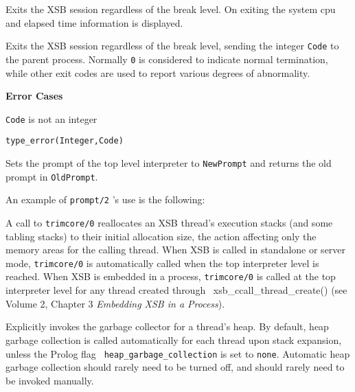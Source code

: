 \begin{description}
%
    Exits the XSB session regardless of the break level.  On exiting
    the system cpu and elapsed time information is displayed.

%
Exits the XSB session regardless of the break level, sending the
integer {\tt Code} to the parent process.  Normally {\tt 0} is
considered to indicate normal termination, while other exit codes are
used to report various degrees of abnormality.

{\bf Error Cases}
\bi
\item 	{\tt Code} is not an integer
\bi
\item 	{\tt type\_error(Integer,Code)}
\ei
\ei

    Sets the prompt of the top level interpreter to {\tt NewPrompt} and 
    returns the old prompt in {\tt OldPrompt}.

    An example of {\tt prompt/2} 's use is the following:


%
A call to {\tt trimcore/0} reallocates an XSB thread's execution
stacks (and some tabling stacks) to their initial allocation size, the
action affecting only the memory areas for the calling thread.  When
XSB is called in standalone or server mode, {\tt trimcore/0} is
automatically called when the top interpreter level is reached.  When
XSB is embedded in a process, {\tt trimcore/0} is called at the top
interpreter level for any thread created through
{\ xsb\_ccall\_thread\_create()} (see Volume 2, Chapter 3 {\em
  Embedding XSB in a Process}).

%
Explicitly invokes the garbage collector for a thread's heap. By
default, heap garbage collection is called automatically for each
thread upon stack expansion, unless the Prolog flag {\tt
  heap\_garbage\_collection} is set to {\tt none}.  Automatic heap
garbage collection should rarely need to be turned off, and should
rarely need to be invoked manually.


\end{description}
